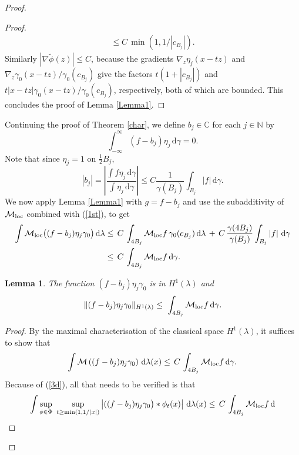 \documentclass{amsart}                 %
\newtheorem{lemma}[theorem]{Lemma}
\numberwithin{equation}{section}
\renewcommand\mod[1]{\left\vert{#1}\right\vert}
\newcommand\norm[2]{{\Vert{#1}\Vert_{#2}}}
\newcommand\wrt{\,\mathrm{d}}
\newcommand\1{{\bf 1}}
\newcommand\BC{\mathbb{C}}
\newcommand\BN{\mathbb{N}}
\newcommand\cM{\mathcal{M}}  \newcommand\fM{\mathfrak{M}}
\newcommand\mlo {\cM_{\textnormal{loc}}}
\newcommand\ga{\gamma}    \newcommand\Ga{\Gamma}
\begin{document}
\begin{proof}
\begin{proof}
\begin{align*}
 \le C\,{\min(1, 1/\mod{c_{B_j}})}.
\end{align*}
Similarly $\mod{\nabla\tilde{\phi}(z)}\le C$, because the gradients $
\nabla_z\eta_j
(x-tz)$ and $\nabla_z\gamma_0(x-tz)/\gamma_0(c_{B_j})$  give the 
factors $t(1+\mod{c_{B_j}})$ 
and $t\mod{x-tz}\gamma_0(x-tz)/\gamma_0(c_{B_j})$, respectively, 
both of which 
are bounded. This concludes the proof of Lemma \ref{Lemma1}.
\end{proof}
Continuing the proof of Theorem \ref{char}, we define $b_j\in\BC$ for each $j \in \BN$ by
\begin{equation}\label{mz}
\int_{-\infty}^\infty (f-b_j)\eta_j \wrt \gamma =0. 
\end{equation}
Note that since $\eta_j=1$ on $\frac12 B_j$,
\begin{equation}\label{1st}
\mod{b_j} = \left|\frac{\int{f\eta_j}\wrt\gamma}
{\int \eta_j \wrt \ga}\right|\le C
\frac{1}{\gamma(B_j)}{\int_{B_j}\mod{f}\wrt\gamma}.
\end{equation}
We now apply Lemma \ref{Lemma1} with $g=f - b_j$ and use the
subadditivity of $\mlo$ combined with (\ref{1st}), to get
\begin{align}\label{3d}
\int \mlo\big((f-b_j)\eta_j\gamma_0\big)\wrt\lambda&\le\,C\, 
\int_{4B_j} \mlo f \, \gamma_0(c_{B_j})\wrt\lambda 
\,+\,C\, \frac
{\ga(4B_j)}{\ga(B_j)}\int_{B_j} \mod{f}\wrt \gamma \nonumber \\
&\le\,C\, \int_
{4B_j}\mlo f \wrt\gamma.
\end{align}
\par
\begin{lemma}\label{Lemma2}
The function $(f-b_j)\eta_j\gamma_0$ is in $H^1(\lambda)$ 
and
\begin{equation}\label{4d}
\norm{(f-b_j)\eta_j\gamma_0}{H^1(\lambda)}\le\,\, \int_{4B_j}\mlo f \wrt
\gamma.
\end{equation}
\end{lemma}
\begin{proof}
By the maximal characterisation of the classical space $H^1(\lambda)
$, it suffices to show that 
\begin{equation}\label{5th}
\int\cM\left( (f-b_j)\eta_j\gamma_0\right)\wrt\lambda(x)\le \,C\, \int_
{4B_j}\mlo f \wrt\gamma.
\end{equation}
Because of (\ref{3d}), all that needs to be  verified is that
\begin{equation}\label{6th}
\int\sup_{\phi\in\Phi}\ \sup_{t\ge\min(1,1/\mod{x})} \mod{((f-b_j)
\eta_j\gamma_0\big)*\phi_t(x)}\wrt\lambda(x) \le \,C\, \int_{4B_j}\mlo f \wrt

\end{equation}
\end{proof}
\end{proof}
\end{document}
